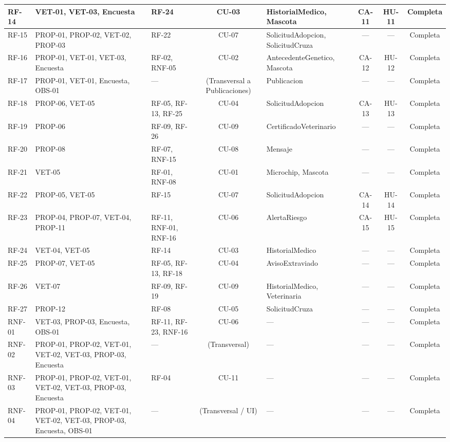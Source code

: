 \documentclass[journal,onecolumn]{IEEEtran}
\begin{document}
\begin{landscape}
\begin{table}[H]
\begin{tabularx}{\linewidth}{|l|X|X|c|X|c|c|c|}
RF-14 & VET-01, VET-03, Encuesta & RF-24 & CU-03 & HistorialMedico, Mascota & CA-11 & HU-11 & Completa \\ \hline
RF-15 & PROP-01, PROP-02, VET-02, PROP-03 & RF-22 & CU-07 & SolicitudAdopcion, SolicitudCruza & --- & --- & Completa \\ \hline
RF-16 & PROP-01, VET-01, VET-03, Encuesta & RF-02, RNF-05 & CU-02 & AntecedenteGenetico, Mascota & CA-12 & HU-12 & Completa \\ \hline
RF-17 & PROP-01, VET-01, Encuesta, OBS-01 & --- & (Transversal a Publicaciones) & Publicacion & --- & --- & Completa \\ \hline
RF-18 & PROP-06, VET-05 & RF-05, RF-13, RF-25 & CU-04 & SolicitudAdopcion & CA-13 & HU-13 & Completa \\ \hline
RF-19 & PROP-06 & RF-09, RF-26 & CU-09 & CertificadoVeterinario & --- & --- & Completa \\ \hline
RF-20 & PROP-08 & RF-07, RNF-15 & CU-08 & Mensaje & --- & --- & Completa \\ \hline
RF-21 & VET-05 & RF-01, RNF-08 & CU-01 & Microchip, Mascota & --- & --- & Completa \\ \hline
RF-22 & PROP-05, VET-05 & RF-15 & CU-07 & SolicitudAdopcion & CA-14 & HU-14 & Completa \\ \hline
RF-23 & PROP-04, PROP-07, VET-04, PROP-11 & RF-11, RNF-01, RNF-16 & CU-06 & AlertaRiesgo & CA-15 & HU-15 & Completa \\ \hline
RF-24 & VET-04, VET-05 & RF-14 & CU-03 & HistorialMedico & --- & --- & Completa \\ \hline
RF-25 & PROP-07, VET-05 & RF-05, RF-13, RF-18 & CU-04 & AvisoExtraviado & --- & --- & Completa \\ \hline
RF-26 & VET-07 & RF-09, RF-19 & CU-09 & HistorialMedico, Veterinaria & --- & --- & Completa \\ \hline
RF-27 & PROP-12 & RF-08 & CU-05 & SolicitudCruza & --- & --- & Completa \\ \hline
RNF-01 & VET-03, PROP-03, Encuesta, OBS-01 & RF-11, RF-23, RNF-16 & CU-06 & --- & --- & --- & Completa \\ \hline
RNF-02 & PROP-01, PROP-02, VET-01, VET-02, VET-03, PROP-03, Encuesta & --- & (Transversal) & --- & --- & --- & Completa \\ \hline
RNF-03 & PROP-01, PROP-02, VET-01, VET-02, VET-03, PROP-03, Encuesta & RF-04 & CU-11 & --- & --- & --- & Completa \\ \hline
RNF-04 & PROP-01, PROP-02, VET-01, VET-02, VET-03, PROP-03, Encuesta, OBS-01 & --- & (Transversal / UI) & --- & --- & --- & Completa \\ \hline

\end{tabularx}
\end{table}
\end{landscape}
\end{document}
